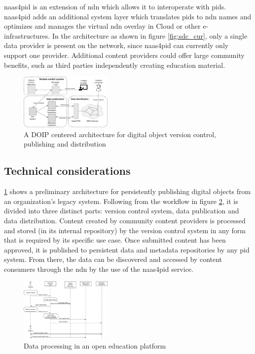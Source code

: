 \documentclass[conference]{IEEEtran}
\begin{document}
\gls{naas4pid} is an extension of \gls{ndn} which allows it to interoperate with \glspl{pid}. \gls{naas4pid} adds an additional system layer which translates \glspl{pid} to \gls{ndn} names and optimizes and manages the virtual \gls{ndn} overlay in Cloud or other e-infrastructures. In the architecture as shown in figure \ref{fig:sdc_cur}, only a single data provider is present on the network, since \gls{naas4pid} can currently only support one provider. Additional content providers could offer large community benefits, such as third parties independently creating education material.

\begin{figure}[h]
\centering
\caption{A DOIP centered architecture for digital object version control, publishing and distribution}
\label{fig:architecture}
\includegraphics[width=0.4\textwidth]{images/architecture.png}
\end{figure}
\subsection{Technical considerations}

\ref{fig:architecture} shows a preliminary architecture for persistently publishing digital objects from an organization’s legacy system. Following from the workflow in figure \ref{fig:sequence}, it is divided into three distinct parts: version control system, data publication and data distribution. Content created by community content providers is processed and stored (in its internal repository) by the version control system in any form that is required by its specific use case. Once submitted content has been approved, it is published to persistent data and metadata repositories by any \gls{pid} system. From there, the data can be discovered and accessed by content consumers through the \gls{ndn} by the use of the \gls{naas4pid} service.

\begin{figure}[h]
\centering
\caption{Data processing in an open education platform}
\label{fig:sequence}
\includegraphics[width=0.4\textwidth]{images/sequence.png}
\end{figure}
\end{document}
